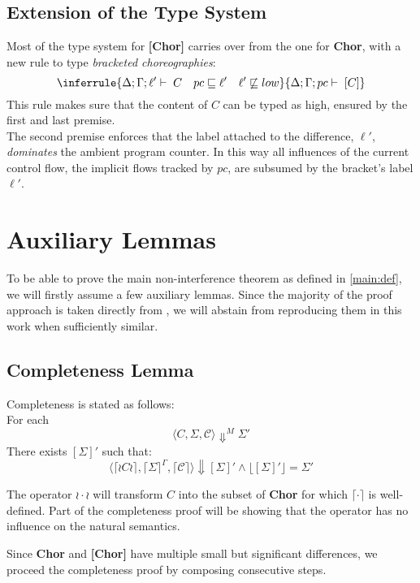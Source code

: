 \documentclass[12pt,a4paper,twoside]{book}
\begin{document}
\subsection{Extension of the Type System}
Most of the type system for \textbf{[Chor]} carries over from the one for \textbf{Chor}, with a new rule to type \emph{bracketed choreographies}:
$$
  \inferrule
  {\Delta;\Gamma;\ell' \vdash \; C  \quad pc \sqsubseteq \ell' \quad \ell' \not\sqsubseteq low}
  {\Delta;\Gamma;pc \vdash \; [C]}
$$
This rule makes sure that the content of $C$ can be typed as high, ensured by the first and last premise.\\
The second premise enforces that the label attached to the difference, \(\ell'\), \emph{dominates} the ambient program counter. In this way all influences of the current control flow, the implicit flows tracked by \(pc\), are subsumed by the bracket’s label \(\ell'\).

\section{Auxiliary Lemmas}
To be able to prove the main non-interference theorem as defined in \ref{main:def}, we will firstly assume a few auxiliary lemmas. Since the majority of the proof approach is taken directly from \cite{myers2011proving}, we will abstain from reproducing them in this work when sufficiently similar.

\subsection{Completeness Lemma}\label{chap:compl}
Completeness is stated as follows:\\
For each
$$
\langle C, \Sigma, \mathscr{C} \rangle \Downarrow^M \Sigma'
$$
There exists $[\Sigma]'$ such that:
\begin{equation}
\label{aux:compl}
	\langle \lceil \wr C \wr \rceil, \lceil \Sigma \rceil^\Gamma, \lceil \mathscr{C} \rceil \rangle \Downarrow [\Sigma]'
\land \lfloor [\Sigma]' \rfloor = \Sigma'
\end{equation}

The operator $\wr \cdot \wr$ will transform $C$ into the subset of \textbf{Chor} for which
$\lceil \cdot \rceil$ is well-defined. Part of the completeness proof will be showing that the operator has no influence on the natural semantics.

Since \textbf{Chor} and \textbf{[Chor]} have multiple small but significant differences, we proceed the completeness proof by composing consecutive steps.
\end{document}
